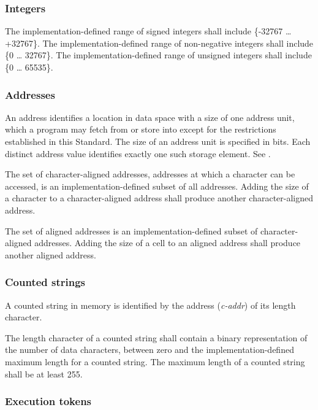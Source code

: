 \subsubsection{Integers} %

The implementation-defined range of signed integers shall include
\{-32767 {\ldots} +32767\}. The imple\-mentation-defined range of
non-negative integers shall include \{0 {\ldots} 32767\}. The
imple\-mentation-defined range of unsigned integers shall include
\{0 {\ldots} 65535\}.

\subsubsection{Addresses} %
\label{usage:addr}

An address identifies a location in data space with a size of one
address unit, which a program may fetch from or store into except
for the restrictions established in this Standard. The size of an
address unit is specified in bits. Each distinct address value
identifies exactly one such storage element.
See .

The set of character-aligned addresses, addresses at which a
character can be accessed, is an implementation-defined subset of
all addresses. Adding the size of a character to a character-aligned
address shall produce another character-aligned address.

The set of aligned addresses is an implementation-defined subset
of character-aligned addresses. Adding the size of a cell to an
aligned address shall produce another aligned address.

\subsubsection{Counted strings} %
\label{usage:cstring}

A counted string in memory is identified by the address
(\emph{c-addr}) of its length character.

The length character of a counted string shall contain a binary
representation of the number of data characters, between zero and
the implementation-defined maximum length for a counted string.
The maximum length of a counted string shall be at least 255.

\subsubsection{Execution tokens} %

